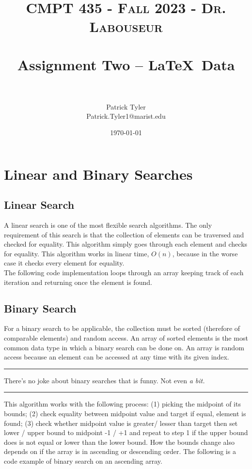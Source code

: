 \documentclass[letterpaper, 10pt]{article}
\title{	
   \normalfont \normalsize 
   \textsc{CMPT 435 - Fall 2023 - Dr. Labouseur} \\[10pt] %
   \horrule{0.5pt} \\[0.25cm] 	%
   \huge Assignment Two -- \LaTeX ~Data\\     	    %
   \horrule{0.5pt} \\[0.25cm] 	%
}
\author{Patrick Tyler \\ \normalsize Patrick.Tyler1@marist.edu}
\date{\normalsize\today} 	%
\begin{document}
\maketitle %


\section{Linear and Binary Searches}
\subsection{Linear Search}
A linear search is one of the most flexible search algorithms. The only requirement of this search is that
the collection of elements can be traversed and checked for equality. This algorithm simply goes through
each element and checks for equality. This algorithm works in linear time, $O(n)$, because in the worse
case it checks every element for equality. \\
\newline
\noindent
The following code implementation loops through an array keeping track of each iteration and returning
once the element is found.


\subsection{Binary Search}
For a binary search to be applicable, the collection must be sorted (therefore of comparable elements)
and random access. An array of sorted elements is the most common data type in which a binary search
can be done on. An array is random access because an element can be accessed at any time with its
given index.\\
\vspace{.25cm}
\hrule
\vspace{.25cm}
\noindent
There's no joke about binary searches that is funny. Not even \textit{a bit.}\\
\hrule
\vspace{1cm}
This algorithm works with the following process: (1) picking the midpoint of its bounds;
(2) check equality between midpoint value and target if equal, element is found;
(3) check whether midpoint value is greater/ lesser than target then set lower / upper bound to
midpoint -1 / +1 and repeat to step 1 if the upper bound does is not equal or lower than the lower bound. 
How the bounds change also depends on if the array is in ascending or descending order.
The following is a code example of binary search on an ascending array.

\end{document}
